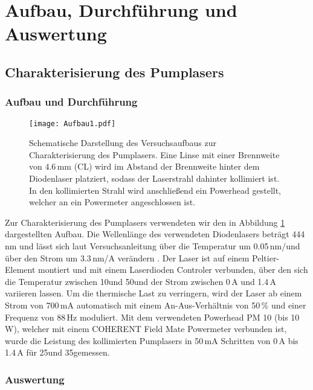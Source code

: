 \section{Aufbau, Durchführung und Auswertung}

\subsection{Charakterisierung des Pumplasers}


\subsubsection{Aufbau und Durchführung}

\begin{figure}[H]
\begin{center}
  \texttt{[image: Aufbau1.pdf]}
  \caption{Schematische Darstellung des Versuchsaufbaus zur Charakterisierung des Pumplasers. Eine
  Linse mit einer Brennweite von 4.6\,mm (CL) wird im Abstand der Brennweite hinter dem Diodenlaser
  platziert, sodass der Laserstrahl dahinter kollimiert ist. In den kollimierten Strahl wird
  anschließend ein Powerhead gestellt, welcher an ein Powermeter angeschlossen ist.}
  \label{img:aufbau1}
\end{center}
\end{figure}

Zur Charakterisierung des Pumplasers verwendeten wir den in Abbildung \ref{img:aufbau1}
dargestellten Aufbau. Die Wellenlänge des verwendeten Diodenlasers beträgt 444\,nm und lässt sich
laut Versuchsanleitung über die Temperatur um 0.05\,nm/\grad und über den Strom um 3.3\,nm/A
verändern \cite{Versuchsanleitung}. Der Laser ist auf einem Peltier-Element montiert und mit einem
Laserdioden Controler verbunden, über den sich die Temperatur zwischen 10\grad und 50\grad und der
Strom zwischen 0\,A und 1.4\,A variieren lassen. Um die thermische Last zu verringern, wird der
Laser ab einem Strom von 700\,mA automatisch mit einem An-Aus-Verhältnis von 50\,\% und einer Frequenz von 88\,Hz moduliert.
Mit dem verwendeten Powerhead PM 10 (bis 10\,W), welcher mit einem COHERENT Field Mate Powermeter
verbunden ist, wurde die Leistung des kollimierten Pumplasers in 50\,mA Schritten von 0\,A bis
1.4\,A für 25\grad und 35\grad gemessen.


\subsubsection{Auswertung}

